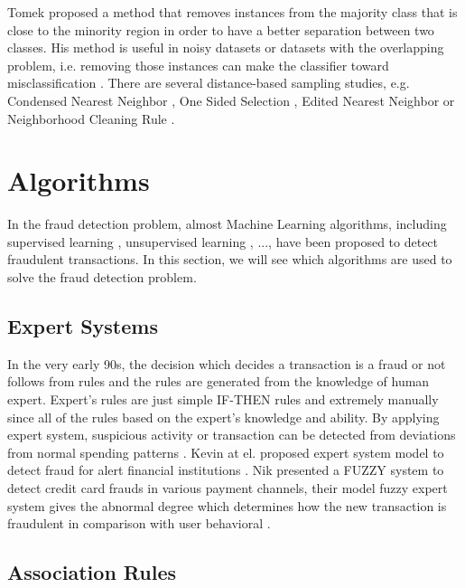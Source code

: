 Tomek \citep{tomek1976two} proposed a method that removes instances from the majority class that is close to the minority region in order to have a better separation between two classes. His method is useful in noisy datasets or datasets with the overlapping problem, i.e. removing those instances can make the classifier toward misclassification \citep{suman2005methods}. There are several distance-based sampling studies, e.g. Condensed Nearest Neighbor \citep{hart1968condensed}, One Sided Selection \citep{kubat1997addressing}, Edited Nearest Neighbor \citep{wilson1972asymptotic} or Neighborhood Cleaning Rule \citep{laurikkala2001improving}.


\section{Algorithms}
\label{algorithms}

In the fraud detection problem, almost Machine Learning algorithms, including supervised learning \citep{chan1999distributed, kubat1997addressing, bhattacharyya2011data}, unsupervised learning \citep{tasoulis2006unsupervised, bolton2001unsupervised}, ..., have been proposed to detect fraudulent transactions. In this section, we will see which algorithms are used to solve the fraud detection problem.


\subsection*{Expert Systems}

In the very early 90s, the decision which decides a transaction is a fraud or not follows from rules and the rules are generated from the knowledge of human expert. Expert's rules are just simple IF-THEN rules and extremely manually since all of the rules based on the expert's knowledge and ability. By applying expert system, suspicious activity or transaction can be detected from deviations from normal spending patterns \cite{leonard1995development}. Kevin at el. proposed expert system model to detect fraud for alert financial institutions \cite{leonard1993detecting}. Nik presented a FUZZY system to detect credit card frauds in various payment channels, their model fuzzy expert system gives the abnormal degree which determines how the new transaction is fraudulent in comparison with user behavioral \cite{haratinik2012fuzzgy}.


\subsection*{Association Rules}

